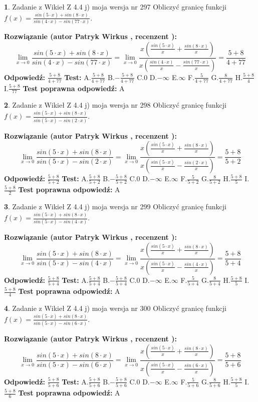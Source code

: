 \documentclass[12pt, a4paper]{article}
\theoremstyle{definition} %
\newtheorem{zad}{}
\newcommand{\zadStart}[1]{\begin{zad}#1\newline}
\newcommand{\zadStop}{\end{zad}}
\newcommand{\rozwStart}[2]{\noindent \textbf{Rozwiązanie (autor #1 , recenzent #2): }\newline}
\newcommand{\rozwStop}{\newline}
\newcommand{\odpStart}{\noindent \textbf{Odpowiedź:}\newline}
\newcommand{\odpStop}{\newline}
\newcommand{\testStart}{\noindent \textbf{Test:}\newline}
\newcommand{\testStop}{\newline}
\newcommand{\kluczStart}{\noindent \textbf{Test poprawna odpowiedź:}\newline}
\newcommand{\kluczStop}{\newline}
\begin{document}
\zadStart{Zadanie z Wikieł Z 4.4 j) moja wersja nr 297}
Obliczyć granicę funkcji $f(x)=\frac{sin(5\cdot x) +sin(8\cdot x)}{sin(4\cdot x) -sin(77\cdot x)}$.
\zadStop
\rozwStart{Patryk Wirkus}{}
$$\lim\limits_{x\to 0}\frac{sin(5\cdot x) +sin(8\cdot x)}{sin(4\cdot x) -sin(77\cdot x)}=\lim\limits_{x\to 0}\frac{x(\frac{sin(5\cdot x)}{x}+\frac{sin(8\cdot x)}{x})}{x(\frac{sin(4\cdot x)}{x}-\frac{sin(77\cdot x)}{x})}=\frac{5+8}{4+77}$$
\rozwStop
\odpStart
$\frac{5+8}{4+77}$
\odpStop
\testStart
A.$\frac{5+8}{4+77}$
B.$-\frac{5+8}{4+77}$
C.$0$
D.$-\infty$
E.$\infty$
F.$\frac{5}{4+77}$
G.$\frac{8}{4+77}$
H.$\frac{5+8}{4}$
I.$\frac{5+8}{77}$
\testStop
\kluczStart
A
\kluczStop



\zadStart{Zadanie z Wikieł Z 4.4 j) moja wersja nr 298}
Obliczyć granicę funkcji $f(x)=\frac{sin(5\cdot x) +sin(8\cdot x)}{sin(5\cdot x) -sin(2\cdot x)}$.
\zadStop
\rozwStart{Patryk Wirkus}{}
$$\lim\limits_{x\to 0}\frac{sin(5\cdot x) +sin(8\cdot x)}{sin(5\cdot x) -sin(2\cdot x)}=\lim\limits_{x\to 0}\frac{x(\frac{sin(5\cdot x)}{x}+\frac{sin(8\cdot x)}{x})}{x(\frac{sin(5\cdot x)}{x}-\frac{sin(2\cdot x)}{x})}=\frac{5+8}{5+2}$$
\rozwStop
\odpStart
$\frac{5+8}{5+2}$
\odpStop
\testStart
A.$\frac{5+8}{5+2}$
B.$-\frac{5+8}{5+2}$
C.$0$
D.$-\infty$
E.$\infty$
F.$\frac{5}{5+2}$
G.$\frac{8}{5+2}$
H.$\frac{5+8}{5}$
I.$\frac{5+8}{2}$
\testStop
\kluczStart
A
\kluczStop



\zadStart{Zadanie z Wikieł Z 4.4 j) moja wersja nr 299}
Obliczyć granicę funkcji $f(x)=\frac{sin(5\cdot x) +sin(8\cdot x)}{sin(5\cdot x) -sin(4\cdot x)}$.
\zadStop
\rozwStart{Patryk Wirkus}{}
$$\lim\limits_{x\to 0}\frac{sin(5\cdot x) +sin(8\cdot x)}{sin(5\cdot x) -sin(4\cdot x)}=\lim\limits_{x\to 0}\frac{x(\frac{sin(5\cdot x)}{x}+\frac{sin(8\cdot x)}{x})}{x(\frac{sin(5\cdot x)}{x}-\frac{sin(4\cdot x)}{x})}=\frac{5+8}{5+4}$$
\rozwStop
\odpStart
$\frac{5+8}{5+4}$
\odpStop
\testStart
A.$\frac{5+8}{5+4}$
B.$-\frac{5+8}{5+4}$
C.$0$
D.$-\infty$
E.$\infty$
F.$\frac{5}{5+4}$
G.$\frac{8}{5+4}$
H.$\frac{5+8}{5}$
I.$\frac{5+8}{4}$
\testStop
\kluczStart
A
\kluczStop



\zadStart{Zadanie z Wikieł Z 4.4 j) moja wersja nr 300}
Obliczyć granicę funkcji $f(x)=\frac{sin(5\cdot x) +sin(8\cdot x)}{sin(5\cdot x) -sin(6\cdot x)}$.
\zadStop
\rozwStart{Patryk Wirkus}{}
$$\lim\limits_{x\to 0}\frac{sin(5\cdot x) +sin(8\cdot x)}{sin(5\cdot x) -sin(6\cdot x)}=\lim\limits_{x\to 0}\frac{x(\frac{sin(5\cdot x)}{x}+\frac{sin(8\cdot x)}{x})}{x(\frac{sin(5\cdot x)}{x}-\frac{sin(6\cdot x)}{x})}=\frac{5+8}{5+6}$$
\rozwStop
\odpStart
$\frac{5+8}{5+6}$
\odpStop
\testStart
A.$\frac{5+8}{5+6}$
B.$-\frac{5+8}{5+6}$
C.$0$
D.$-\infty$
E.$\infty$
F.$\frac{5}{5+6}$
G.$\frac{8}{5+6}$
H.$\frac{5+8}{5}$
I.$\frac{5+8}{6}$
\testStop
\kluczStart
A
\kluczStop
\end{document}
